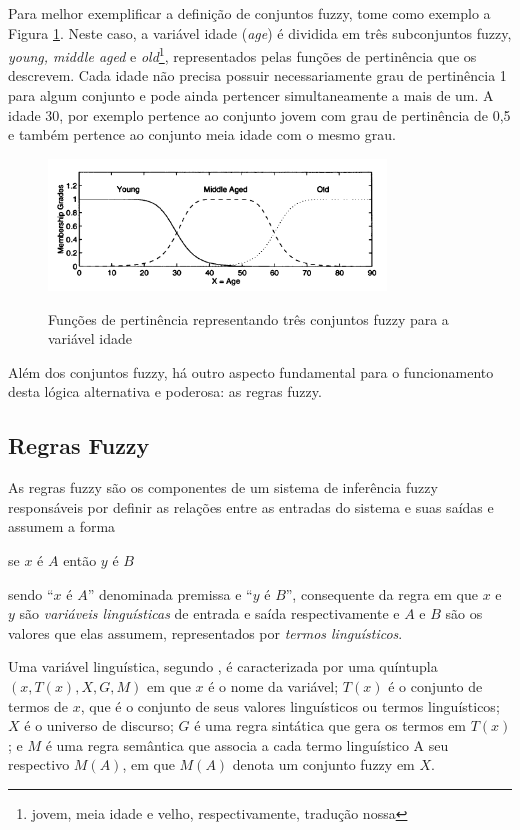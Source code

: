 Para melhor exemplificar a definição de conjuntos fuzzy, tome como exemplo a Figura \ref{fig:fuzzy_sets_jang}. Neste caso, a variável idade (\textit{age}) é dividida em três subconjuntos fuzzy, \textit{young, middle aged} e \textit{old}\footnote{jovem, meia idade e velho, respectivamente, tradução nossa}, representados pelas funções de pertinência que os descrevem. Cada idade não precisa possuir necessariamente grau de pertinência 1 para algum conjunto e pode ainda pertencer simultaneamente a mais de um. A idade 30, por exemplo pertence ao conjunto jovem com grau de pertinência de 0,5 e também pertence ao conjunto meia idade com o mesmo grau.

\begin{figure}[!htb]
    \centering
    \caption{Funções de pertinência representando três conjuntos fuzzy para a variável idade}
    \includegraphics[width=0.8\textwidth]{./04-figuras/fund_teorica/fuzzy_sets_jang}
    \label{fig:fuzzy_sets_jang}
\end{figure}

Além dos conjuntos fuzzy, há outro aspecto fundamental para o funcionamento desta lógica alternativa e poderosa: as regras fuzzy.

\subsection{Regras Fuzzy}
\label{sec:regras_fuzzy}

As regras fuzzy são os componentes de um sistema de inferência fuzzy responsáveis por definir as relações entre as entradas do sistema e suas saídas e assumem a forma
\begin{center}
se $x$ é $A$ então $y$ é $B$
\end{center}
sendo ``$x$ é $A$'' denominada premissa  e ``$y$ é $B$'', consequente da regra em que $x$ e $y$ são \textit{variáveis linguísticas} de entrada e saída respectivamente  e $A$ e $B$ são os valores que elas assumem, representados por \textit{termos linguísticos}.

Uma variável linguística, segundo , é caracterizada por uma quíntupla $(x,T(x),X,G,M)$ em que $x$ é o nome da variável; $T(x)$ é o conjunto de termos de $x$, que é o conjunto de seus valores linguísticos ou termos linguísticos; $X$ é o universo de discurso; $G$ é uma regra sintática que gera os termos em $T(x)$; e $M$ é uma regra semântica que associa a cada termo linguístico A seu respectivo $M(A)$, em que $M(A)$ denota um conjunto fuzzy em $X$.

